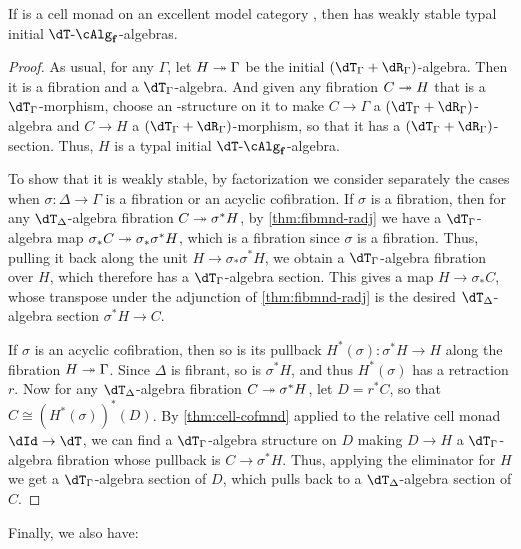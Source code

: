 \documentclass[referee]{psp}
\def\alg{\text{-}\cAlg}
\def\algf{\alg_{\mathbf{f}}}
\begin{document}
\begin{thm}\label{thm:cell-wkstab}
  If \dT is a cell monad on an excellent model category \sM, then \fibmf has weakly stable typal initial $\dT\algf$-algebras.
\end{thm}
\begin{proof}
  As usual, for any $\Gamma$, let $H\twoheadrightarrow\Gamma$ be the initial $(\dT_\Gamma+\dR_\Gamma)$-algebra.
  Then it is a fibration and a $\dT_\Gamma$-algebra.
  And given any fibration $C\twoheadrightarrow H$ that is a $\dT_\Gamma$-morphism, choose an \dR-structure on it to make $C\to\Gamma$ a $(\dT_\Gamma+\dR_\Gamma)$-algebra and $C\to H$ a $(\dT_\Gamma+\dR_\Gamma)$-morphism, so that it has a $(\dT_\Gamma+\dR_\Gamma)$-section.
  Thus, $H$ is a typal initial $\dT\algf$-algebra.

  To show that it is weakly stable, by factorization we consider separately the cases when $\sigma:\Delta\to\Gamma$ is a fibration or an acyclic cofibration.
  If $\sigma$ is a fibration, then for any $\dT_\Delta$-algebra fibration $C\twoheadrightarrow \sigma^*H$, by \cref{thm:fibmnd-radj} we have a $\dT_\Gamma$-algebra map $\sigma_*C\twoheadrightarrow \sigma_*\sigma^*H$, which is a fibration since $\sigma$ is a fibration.
  Thus, pulling it back along the unit $H\to \sigma_*\sigma^* H$, we obtain a $\dT_\Gamma$-algebra fibration over $H$, which therefore has a $\dT_\Gamma$-algebra section.
  This gives a map $H\to \sigma_* C$, whose transpose under the adjunction of \cref{thm:fibmnd-radj} is the desired $\dT_\Delta$-algebra section $\sigma^*H \to C$.

  If $\sigma$ is an acyclic cofibration, then so is its pullback $H^*(\sigma) : \sigma^*H \to H$ along the fibration $H\twoheadrightarrow \Gamma$.
  Since $\Delta$ is fibrant, so is $\sigma^*H$, and thus $H^*(\sigma)$ has a retraction $r$.
  Now for any $\dT_\Delta$-algebra fibration $C\twoheadrightarrow \sigma^*H$, let $D = r^*C$, so that $C \cong (H^*(\sigma))^*(D)$.
  By \cref{thm:cell-cofmnd} applied to the relative cell monad $\dId\to\dT$, we can find a $\dT_\Gamma$-algebra structure on $D$ making $D\to H$ a $\dT_\Gamma$-algebra fibration whose pullback is $C\to\sigma^* H$.
  Thus, applying the eliminator for $H$ we get a $\dT_\Gamma$-algebra section of $D$, which pulls back to a $\dT_\Delta$-algebra section of $C$.
\end{proof}

Finally, we also have:
\end{document}
